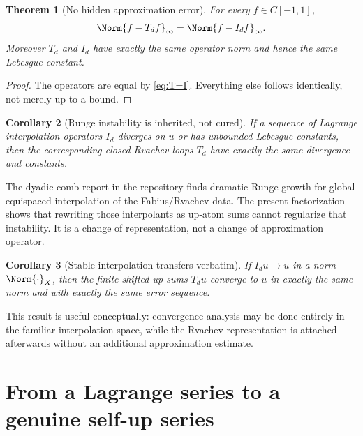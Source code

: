 \documentclass[11pt,oneside]{article}
\numberwithin{equation}{section}
\newtheorem{theorem}{Theorem}[section]
\newtheorem{corollary}[theorem]{Corollary}
\theoremstyle{definition}
\theoremstyle{remark}
\begin{document}
\begin{theorem}[No hidden approximation error]
\label{thm:no-hidden-error}
For every \(f\in C[-1,1]\),
\begin{equation}
 \Norm{f-T_df}_\infty=\Norm{f-I_df}_\infty.
 \label{eq:same-error}
\end{equation}
Moreover \(T_d\) and \(I_d\) have exactly the same operator norm and hence the
same Lebesgue constant.
\end{theorem}

\begin{proof}
The operators are equal by \eqref{eq:T=I}.  Everything else follows identically,
not merely up to a bound.
\end{proof}

\begin{corollary}[Runge instability is inherited, not cured]
\label{cor:runge}
If a sequence of Lagrange interpolation operators \(I_d\) diverges on \(u\) or has
unbounded Lebesgue constants, then the corresponding closed Rvachev loops \(T_d\)
have exactly the same divergence and constants.
\end{corollary}

The dyadic-comb report in the repository finds dramatic Runge growth for global
equispaced interpolation of the Fabius/Rvachev data.  The present factorization
shows that rewriting those interpolants as up-atom sums cannot regularize that
instability.  It is a change of representation, not a change of approximation
operator.

\begin{corollary}[Stable interpolation transfers verbatim]
\label{cor:stable-transfer}
If \(I_du\to u\) in a norm \(\Norm{\cdot}_X\), then the finite shifted-up sums
\(T_du\) converge to \(u\) in exactly the same norm and with exactly the same
error sequence.
\end{corollary}

This result is useful conceptually: convergence analysis may be done entirely in
the familiar interpolation space, while the Rvachev representation is attached
afterwards without an additional approximation estimate.

\section{From a Lagrange series to a genuine self-up series}
\label{sec:series}
\end{document}

